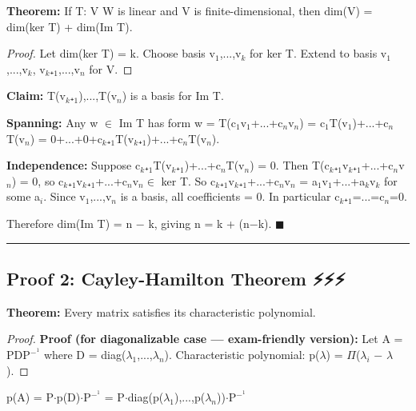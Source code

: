 \documentclass[12pt,a4paper,openany]{book}
\begin{document}
{{\begin{tcolorbox}[colback=lightblue,colframe=thmblue,title=\textbf{Theorem},breakable,boxrule=1.5pt]
\textbf{Theorem:} If T: V  W is linear and V is finite-dimensional, then dim(V) = dim(ker T) + dim(Im T).
\end{tcolorbox}

\begin{proof}

Let dim(ker T) = k. Choose basis {v$_1$,...,v$_k$} for ker T.
Extend to basis {v$_1$,...,v$_k$, v$_k$₊$_1$,...,v$_n$} for V.
\end{proof}

\textbf{Claim:} {T(v$_k$₊$_1$),...,T(v$_n$)} is a basis for Im T.

\textbf{Spanning:} Any w $\in$ Im T has form w = T(c$_1$v$_1$+...+c$_n$v$_n$) = c$_1$T(v$_1$)+...+c$_n$T(v$_n$) = 0+...+0+c$_k$₊$_1$T(v$_k$₊$_1$)+...+c$_n$T(v$_n$). 

\textbf{Independence:} Suppose c$_k$₊$_1$T(v$_k$₊$_1$)+...+c$_n$T(v$_n$) = 0.
Then T(c$_k$₊$_1$v$_k$₊$_1$+...+c$_n$v$_n$) = 0, so c$_k$₊$_1$v$_k$₊$_1$+...+c$_n$v$_n\in$ ker T.
So c$_k$₊$_1$v$_k$₊$_1$+...+c$_n$v$_n$ = a$_1$v$_1$+...+a$_k$v$_k$ for some a$_i$.
Since {v$_1$,...,v$_n$} is a basis, all coefficients = 0. In particular c$_k$₊$_1$=...=c$_n$=0. 

Therefore dim(Im T) = n − k, giving n = k + (n−k). $\blacksquare$

\bigskip\noindent\rule{\textwidth}{0.4pt}\bigskip

\subsection{Proof 2: Cayley-Hamilton Theorem ⚡⚡⚡}

\begin{tcolorbox}[colback=lightblue,colframe=thmblue,title=\textbf{Theorem},breakable,boxrule=1.5pt]
\textbf{Theorem:} Every matrix satisfies its characteristic polynomial.
\end{tcolorbox}

\begin{proof}
\textbf{Proof (for diagonalizable case — exam-friendly version):}
Let A = PDP$^{-}^1$ where D = diag($\lambda_1$,...,$\lambda_n$).
Characteristic polynomial: p($\lambda$) = $\Pi$($\lambda_i$ − $\lambda$).
\end{proof}

p(A) = P$\cdot$p(D)$\cdot$P$^{-}^1$ = P$\cdot$diag(p($\lambda_1$),...,p($\lambda_n$))$\cdot$P$^{-}^1$

}}
\end{document}
